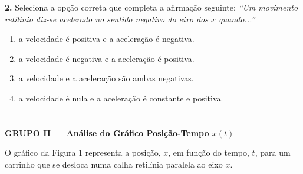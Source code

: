 \documentclass[11pt, a4paper]{article}
\begin{document}
\vspace{0.2cm}

\textbf{2.} Seleciona a opção correta que completa a afirmação seguinte: \textit{``Um movimento retilínio diz-se acelerado no sentido negativo do eixo dos $x$ quando...''}
\begin{enumerate}[label=(\textnormal{\Alph*})]
  \item a velocidade é positiva e a aceleração é negativa.
  \item a velocidade é negativa e a aceleração é positiva.
  \item a velocidade e a aceleração são ambas negativas.
  \item a velocidade é nula e a aceleração é constante e positiva.
\end{enumerate}

\vspace{0.4cm}

\section*{}
\begin{center}
  \colorbox{primaryNavy}{\parbox{0.97\textwidth}{\color{white}\bfseries\large GRUPO II --- Análise do Gráfico Posição-Tempo $x(t)$}}
\end{center}

O gráfico da Figura 1 representa a posição, $x$, em função do tempo, $t$, para um carrinho que se desloca numa calha retilínia paralela ao eixo $x$.
\end{document}
